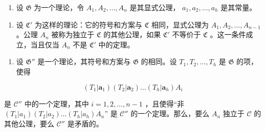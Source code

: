 \exercisegroup

\begin{enumerate}
\def\labelenumi{\arabic{enumi}.}
\tightlist
\item
  设 \(\mathfrak{G}\) 为一个理论，令 \(A_{1}, A_{2}, \ldots, A_{n}\) 是其显式公理， \(a_{1}, a_{2}, \ldots, a_{h}\) 是其常量。
\end{enumerate}

\begin{enumerate}
\def\labelenumi{(\alph{enumi})}
\tightlist
\item
  设 \(\mathfrak{C}'\) 为这样的理论：它的符号和方案与 \(\mathfrak{C}\) 相同，显式公理为 \(A_1, A_2, \ldots, A_{n-1}\) 。公理 \(A_n\) 被称为独立于 \(\mathfrak{C}\) 的其他公理，如果 \(\mathfrak{C}'\) 不等价于 \(\mathfrak{C}\) 。这一条件成立，当且仅当 \(A_n\) 不是 \(\mathfrak{C}'\) 中的定理。
\end{enumerate}

\begin{enumerate}
\def\labelenumi{(\alph{enumi})}
\setcounter{enumi}{1}
\tightlist
\item
  设 \(\mathfrak{G}''\) 是一个理论，其符号和方案与 \(\mathfrak{G}\) 的相同。设 \(T_1, T_2, \ldots, T_h\) 是 \(\mathfrak{G}\) 的项，使得
\end{enumerate}

\[
(T _ {1} | \boldsymbol {a} _ {1}) (T _ {2} | \boldsymbol {a} _ {2}) \dots (T _ {h} | \boldsymbol {a} _ {h}) A _ {i}
\]

是 \(\mathcal{C}''\) 中的一个定理，其中 \(i = 1, 2, \ldots, n - 1\) ，且使得“非 \((T_1|a_1)(T_2|a_2) \ldots (T_h|a_h)A_n\)” 是 \(\mathcal{C}''\) 的一个定理。那么，要么 \(A_n\) 独立于 \(\mathcal{C}\) 的其他公理，要么 \(\mathcal{C}''\) 是矛盾的。

